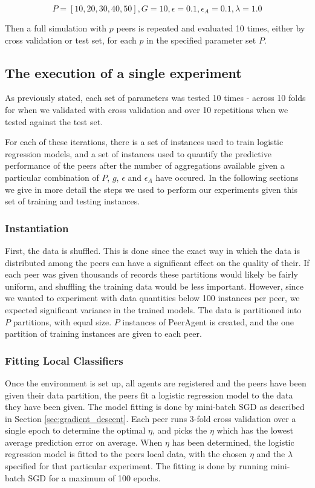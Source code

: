 $$P=[10, 20, 30, 40, 50], G=10, \epsilon=0.1, \epsilon_{A}=0.1, \lambda=1.0$$

Then a full simulation with $p$ peers is repeated and evaluated 10 times, either by cross validation or test set, for each $p$ in the specified parameter set $P$. 

\subsection{The execution of a single experiment}

As previously stated, each set of parameters was tested 10 times - across 10 folds for when we validated with cross validation and over 10 repetitions when we tested against the test set.

For each of these iterations, there is a set of instances used to train logistic regression models, and a set of instances used to quantify the predictive performance of the peers after the number of aggregations available given a particular combination of $P$, $g$, $\epsilon$ and $\epsilon_A$ have occured. In the following sections we give in more detail the steps we used to perform our experiments given this set of training and testing instances.

\subsubsection{Instantiation}


First, the data is shuffled. This is done since the exact way in which the data is distributed among the peers can have a significant effect on the quality of their. If each peer was given thousands of records these partitions would likely be fairly uniform, and shuffling the training data would be less important. However, since we wanted to experiment with data quantities below 100 instances per peer, we expected significant variance in the trained models. The data is partitioned into $P$ partitions, with equal size. $P$ instances of PeerAgent is created, and the one partition of training instances are given to each peer.

\subsubsection{Fitting Local Classifiers}

Once the environment is set up, all agents are registered and the peers have been given their data partition, the peers fit a logistic regression model to the data they have been given. The model fitting is done by mini-batch SGD as described in Section \ref{sec:gradient_descent}. Each peer runs 3-fold cross validation over a single epoch to determine the optimal $\eta$, and picks the $\eta$ which has the lowest average prediction error on average. When $\eta$ has been determined, the logistic regression model is fitted to the peers local data, with the chosen $\eta$ and the $\lambda$ specified for that particular experiment. The fitting is done by running mini-batch SGD for a maximum of 100 epochs.

